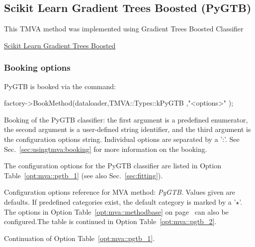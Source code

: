 \subsection{Scikit Learn Gradient Trees Boosted (PyGTB)}
\label{sec:PyGTB}

This TMVA method was implemented using Gradient Trees Boosted Classifier 
 
\href{http://scikit-learn.org/stable/modules/ensemble.html#gradient-boosting}{Scikit Learn Gradient Trees Boosted}


\subsubsection{Booking options}

PyGTB is booked via the command:
\begin{codeexample}
\begin{tmvacode}
factory->BookMethod(dataloader,TMVA::Types::kPyGTB
,"<options>" );
\end{tmvacode}
\caption[.]{\codeexampleCaptionSize Booking of the PyGTB classifier: the first argument is 
		   a predefined enumerator, the second argument is a user-defined 
		   string identifier, and the third argument is the configuration options string.
         Individual options are separated by a ':'. 
         See Sec.~\ref{sec:usingtmva:booking} for more information on the booking.}
\end{codeexample}

The configuration options for the PyGTB classifier are listed in Option Table~\ref{opt:mva::pgtb_1}
(see also Sec.~\ref{sec:fitting}).

\begin{option}[p]

\caption[.]{\optionCaptionSize 
     Configuration options reference for MVA method: {\em PyGTB}.
     Values given are defaults. If predefined categories exist, the default category 
     is marked by a '$\star$'. The options in Option Table~\ref{opt:mva::methodbase} on 
     page~\pageref{opt:mva::methodbase} can also be configured.The table
      is continued in Option Table~\ref{opt:mva::pgtb_2}.  
}
\label{opt:mva::pgtb_1}
\end{option}

\begin{option}[p]

\caption[.]{\optionCaptionSize 
     Continuation of Option Table~\ref{opt:mva::pgtb_1}.     
}
\label{opt:mva::pgtb_2}
\end{option}


